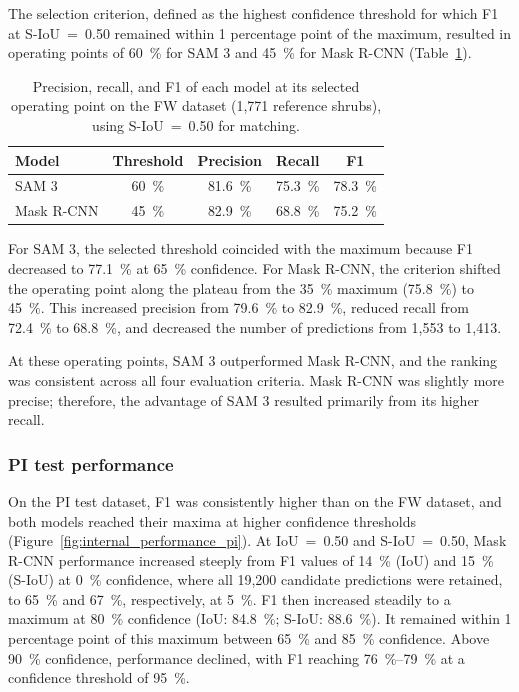 \documentclass[12pt,a4paper]{article}
\begin{document}
The selection criterion, defined as the highest confidence threshold for which F1 at S-IoU~=~0.50 remained within 1 percentage point of the maximum, resulted in operating points of \qty{60}{\percent} for SAM 3 and \qty{45}{\percent} for Mask R-CNN (Table~\ref{tab:fw_operating_points}).

\begin{table}[ht]
    \centering
    \caption{
        Precision, recall, and F1 of each model at its selected operating point on the FW dataset (1,771 reference shrubs), using S-IoU~=~0.50 for matching.
    }
    \label{tab:fw_operating_points}
    \begin{tabular}{lcccc}
        \toprule
        Model & Threshold & Precision & Recall & F1 \\
        \midrule
        SAM 3 & \qty{60}{\percent} & \qty{81.6}{\percent} & \qty{75.3}{\percent} & \qty{78.3}{\percent} \\
        Mask R-CNN & \qty{45}{\percent} & \qty{82.9}{\percent} & \qty{68.8}{\percent} & \qty{75.2}{\percent} \\
        \bottomrule
    \end{tabular}
\end{table}

For SAM 3, the selected threshold coincided with the maximum because F1 decreased to \qty{77.1}{\percent} at \qty{65}{\percent} confidence. For Mask R-CNN, the criterion shifted the operating point along the plateau from the \qty{35}{\percent} maximum (\qty{75.8}{\percent}) to \qty{45}{\percent}. This increased precision from \qty{79.6}{\percent} to \qty{82.9}{\percent}, reduced recall from \qty{72.4}{\percent} to \qty{68.8}{\percent}, and decreased the number of predictions from 1,553 to 1,413.

At these operating points, SAM 3 outperformed Mask R-CNN, and the ranking was consistent across all four evaluation criteria. Mask R-CNN was slightly more precise; therefore, the advantage of SAM 3 resulted primarily from its higher recall.

\subsubsection{PI test performance}

On the PI test dataset, F1 was consistently higher than on the FW dataset, and both models reached their maxima at higher confidence thresholds (Figure~\ref{fig:internal_performance_pi}). At IoU~=~0.50 and S-IoU~=~0.50, Mask R-CNN performance increased steeply from F1 values of \qty{14}{\percent} (IoU) and \qty{15}{\percent} (S-IoU) at \qty{0}{\percent} confidence, where all 19,200 candidate predictions were retained, to \qty{65}{\percent} and \qty{67}{\percent}, respectively, at \qty{5}{\percent}. F1 then increased steadily to a maximum at \qty{80}{\percent} confidence (IoU: \qty{84.8}{\percent}; S-IoU: \qty{88.6}{\percent}). It remained within 1 percentage point of this maximum between \qty{65}{\percent} and \qty{85}{\percent} confidence. Above \qty{90}{\percent} confidence, performance declined, with F1 reaching \qtyrange{76}{79}{\percent} at a confidence threshold of \qty{95}{\percent}.
\end{document}
